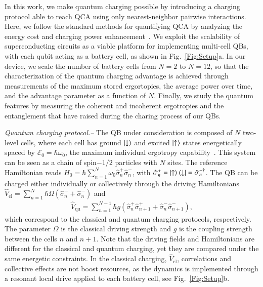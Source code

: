 \documentclass[aps,prl,epsfigure,twocolumn,superscriptaddress]{revtex4-2}
\newcommand{\Ecal}{\mathcal{E}}
\newcommand{\1}{\mathbbm{1}}
\newcommand{\SubFig}[2]{\ref{#1}{\color{blue}#2}}
\newcommand{\RefB}[1]{{\color{black}#1}}
\newcommand{\RefC}[1]{{\color{black}#1}}
\begin{document}
	In this work, we make quantum charging possible by introducing a charging protocol able to \RefC{reach QCA using} only nearest-neighbor pairwise interactions. \RefB{Here, we follow the standard methods for quantifying QCA by analyzing the energy cost and charging power enhancement~\cite{Campaioli:24,PRL2017Binder,Kim:22}}. We exploit the scalability of superconducting circuits as a viable platform for implementing multi-cell QBs, with each qubit acting as a battery cell, as shown in Fig.~\SubFig{Fig:Setup}{a}. In our device, we scale the number of battery cells from $N=2$ to $N=12$, so that the characterization of the quantum charging advantage is achieved through measurements of the maximum stored ergortopies, the average power over time, and the advantage parameter as a function of $N$. \RefB{Finally, we study the quantum features by measuring the coherent and incoherent ergotropies  and the entanglement that have raised during the charing process of our QBs.}

	\emph{Quantum charging protocol.--} The QB under consideration is composed of $N$ two-level cells, where each cell has ground $\ket{\downarrow}$ and excited $\ket{\uparrow}$ states energetically spaced by $\Ecal_{0} = \hbar \omega_{0}$, the maximum individual ergotropy capability~\cite{Yang:23}. This system can be seen as a chain of spin$-1/2$ particles with $N$ sites. The reference Hamiltonian reads $\hat{H}_{0} = \hbar \sum\nolimits_{n=1}^{N} \omega_{0}\hat{\sigma}^{+}_{n}\hat{\sigma}^{-}_{n}$, with $\hat{\sigma}^{+}_{n} = \ket{\uparrow}\bra{\downarrow} = \hat{\sigma}^{-\dagger}_{n}$. The QB can be charged either individually or collectively through the driving Hamiltonians $\hat{V}_{\mathrm{cl}} =  \sum_{n=1}^{N} \hbar\Omega \left(\hat{\sigma}^{+}_{n} + \hat{\sigma}^{-}_{n} \right)$ and
	\begin{align}
		\hat{V}_{\mathrm{qu}} =  \sum\nolimits_{n=1}^{N-1} \hbar g\left(\hat{\sigma}^{+}_{n}\hat{\sigma}^{+}_{n+1} + \hat{\sigma}^{-}_{n}\hat{\sigma}^{-}_{n+1}\right) , \label{Eq:HcollectiveFF}
	\end{align}
	which correspond to the classical and quantum charging protocols, respectively. The parameter $\Omega$ is the classical driving strength and $g$ is the coupling strength between the cells $n$ and $n+1$.  \RefB{Note that the driving fields and Hamiltonians are different for the classical and quantum charging, yet they are compared under the same energetic constraints.} In the classical charging, $\hat{V}_{\mathrm{cl}}$, correlations and collective effects are not boost resources, as the dynamics is implemented through a resonant local drive applied to each battery cell, see Fig.~\SubFig{Fig:Setup}{b}.
\end{document}
